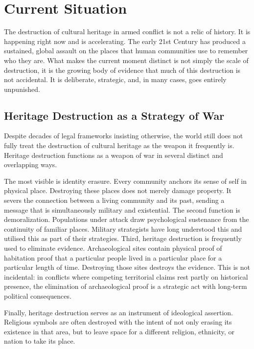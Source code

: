 \section{Current Situation}

The destruction of cultural heritage in armed conflict is not a relic of history. It is happening right now and is accelerating. The early 21st Century has produced a sustained, global assault on the places that human communities use to remember who they are. What makes the current moment distinct is not simply the scale of destruction, it is the growing body of evidence that much of this destruction is not accidental. It is deliberate, strategic, and, in many cases, goes entirely unpunished.

\subsection{Heritage Destruction as a Strategy of War}

Despite decades of legal frameworks insisting otherwise, the world still does not fully treat the destruction of cultural heritage as the weapon it frequently is. Heritage destruction functions as a weapon of war in several distinct and overlapping ways.

The most visible is identity erasure. Every community anchors its sense of self in physical place. Destroying these places does not merely damage property. It severs the connection between a living community and its past, sending a message that is simultaneously military and existential. The second function is demoralization. Populations under attack draw psychological sustenance from the continuity of familiar places. Military strategists have long understood this and utilised this as part of their strategies. Third, heritage destruction is frequently used to eliminate evidence. Archaeological sites contain physical proof of habitation  proof that a particular people lived in a particular place for a particular length of time. Destroying those sites destroys the evidence. This is not incidental: in conflicts where competing territorial claims rest partly on historical presence, the elimination of archaeological proof is a strategic act with long-term political consequences.

Finally, heritage destruction serves as an instrument of ideological assertion. Religious symbols are often destroyed with the intent of not only erasing its existence in that area, but to leave space for a different religion, ethnicity, or nation to take its place.

